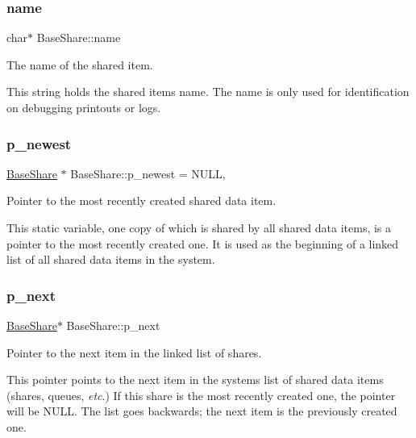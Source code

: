 \subsubsection{\texorpdfstring{name}{name}}
{\footnotesize\ttfamily char$\ast$ Base\+Share\+::name\hspace{0.3cm}{\ttfamily [protected]}}



The name of the shared item. 

This string holds the shared item\textquotesingle{}s name. The name is only used for identification on debugging printouts or logs. \mbox{\label{class_base_share_a0657d8a02509e79c3bb418aaa9cce33c}} 
\subsubsection{\texorpdfstring{p\+\_\+newest}{p\_newest}}
{\footnotesize\ttfamily \mbox{\hyperlink{class_base_share}{Base\+Share}} $\ast$ Base\+Share\+::p\+\_\+newest = N\+U\+LL\hspace{0.3cm}{\ttfamily [static]}, {\ttfamily [protected]}}



Pointer to the most recently created shared data item. 

This {\ttfamily static} variable, one copy of which is shared by all shared data items, is a pointer to the most recently created one. It is used as the beginning of a linked list of all shared data items in the system. \mbox{\label{class_base_share_a8077022ea40c4ba44a6ff07ab24cac83}} 
\subsubsection{\texorpdfstring{p\+\_\+next}{p\_next}}
{\footnotesize\ttfamily \mbox{\hyperlink{class_base_share}{Base\+Share}}$\ast$ Base\+Share\+::p\+\_\+next\hspace{0.3cm}{\ttfamily [protected]}}



Pointer to the next item in the linked list of shares. 

This pointer points to the next item in the system\textquotesingle{}s list of shared data items (shares, queues, {\itshape etc}.) If this share is the most recently created one, the pointer will be {\ttfamily N\+U\+LL}. The list goes backwards; the next item is the previously created one. \mbox{\label{class_base_share_af9176a9e2d467ccc1fd05f84bce4f74a}} 
